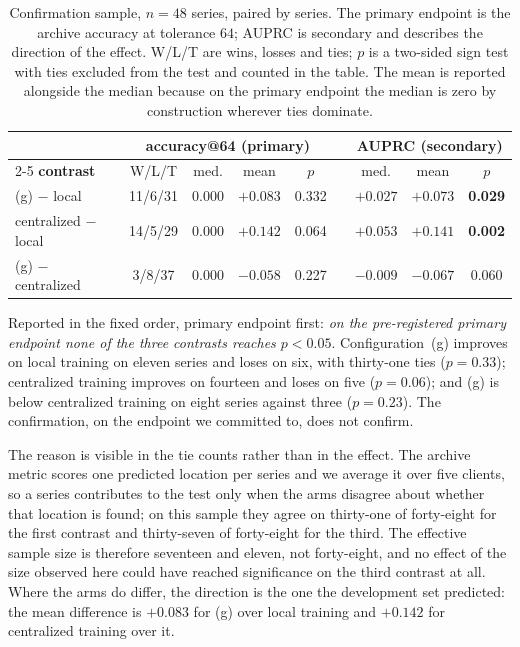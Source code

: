 \documentclass[conference]{IEEEtran}
\begin{document}
\begin{table}[t]
\caption{Confirmation sample, $n=48$ series, paired by series. The primary endpoint is the archive
accuracy at tolerance $64$; AUPRC is secondary and describes the direction of the effect. W/L/T are
wins, losses and ties; $p$ is a two-sided sign test with ties excluded from the test and counted in
the table. The mean is reported alongside the median because on the primary endpoint the median is
zero by construction wherever ties dominate.}
\label{tab:c50}
\centering
\scriptsize
\setlength{\tabcolsep}{4pt}
\renewcommand{\arraystretch}{1.1}
\begin{tabular}{@{}l cccc c ccc@{}}
\hline
& \multicolumn{4}{c}{\textbf{accuracy@64} (primary)} & & \multicolumn{3}{c}{\textbf{AUPRC} (secondary)} \\
\cline{2-5}\cline{7-9}
\textbf{contrast} & W/L/T & med. & mean & $p$ & & med. & mean & $p$ \\
\hline
(g) $-$ local          & 11/6/31 & 0.000 & $+0.083$ & 0.332 & & $+0.027$ & $+0.073$ & \textbf{0.029} \\
centralized $-$ local  & 14/5/29 & 0.000 & $+0.142$ & 0.064 & & $+0.053$ & $+0.141$ & \textbf{0.002} \\
(g) $-$ centralized    & 3/8/37  & 0.000 & $-0.058$ & 0.227 & & $-0.009$ & $-0.067$ & 0.060 \\
\hline
\end{tabular}
\end{table}

Reported in the fixed order, primary endpoint first: \emph{on the pre-registered primary endpoint
none of the three contrasts reaches $p<0.05$}. Configuration~(g) improves on local training on
eleven series and loses on six, with thirty-one ties ($p=0.33$); centralized training improves on
fourteen and loses on five ($p=0.06$); and (g) is below centralized training on eight series
against three ($p=0.23$). The confirmation, on the endpoint we committed to, does not confirm.

The reason is visible in the tie counts rather than in the effect. The archive metric scores one
predicted location per series and we average it over five clients, so a series contributes to the
test only when the arms disagree about whether that location is found; on this sample they agree on
thirty-one of forty-eight for the first contrast and thirty-seven of forty-eight for the third. The
effective sample size is therefore seventeen and eleven, not forty-eight, and no effect of the size
observed here could have reached significance on the third contrast at all. Where the arms do
differ, the direction is the one the development set predicted: the mean difference is $+0.083$ for
(g) over local training and $+0.142$ for centralized training over it.
\end{document}
